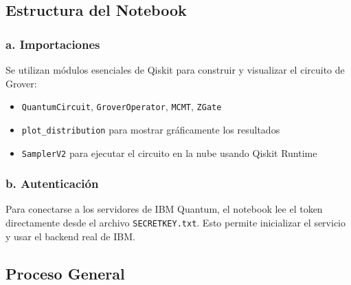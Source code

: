\documentclass{article}
\begin{document}
\subsection*{Estructura del Notebook}

\subsubsection*{a. Importaciones}

Se utilizan módulos esenciales de Qiskit para construir y visualizar el circuito de Grover:

\begin{itemize}
    \item \texttt{QuantumCircuit}, \texttt{GroverOperator}, \texttt{MCMT}, \texttt{ZGate}
    \item \texttt{plot\_distribution} para mostrar gráficamente los resultados
    \item \texttt{SamplerV2} para ejecutar el circuito en la nube usando Qiskit Runtime
\end{itemize}

\subsubsection*{b. Autenticación}

Para conectarse a los servidores de IBM Quantum, el notebook lee el token directamente 
desde el archivo \texttt{SECRETKEY.txt}. Esto permite inicializar el servicio y usar 
el backend real de IBM.


\subsection*{Proceso General}
\end{document}
